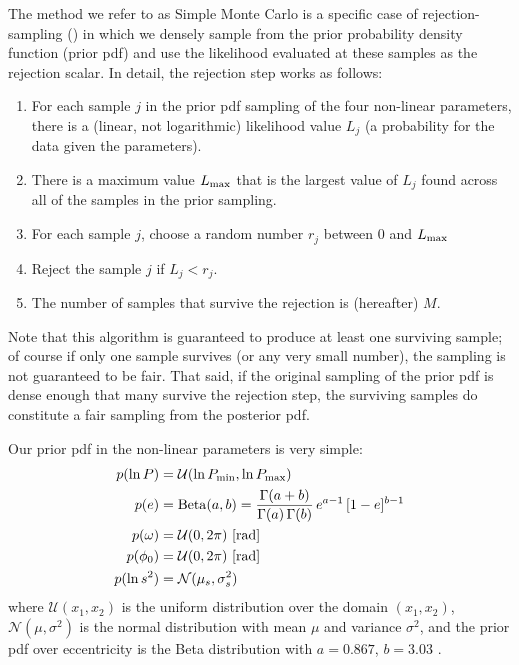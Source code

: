 \documentclass[manuscript, letterpaper]{aastex6}
\begin{document}
The method we refer to as Simple Monte Carlo is a specific case of
rejection-sampling (\citealt{TODO}) in which we densely sample from the prior
probability density function (prior pdf) and use the likelihood evaluated at
these samples as the rejection scalar.
In detail, the rejection step works as follows:
\begin{enumerate}\itemsep0ex
\item For each sample $j$ in the prior pdf sampling of the four non-linear
  parameters, there is a (linear, not logarithmic) likelihood value $L_j$ (a
  probability for the data given the parameters).
\item There is a maximum value $L_{\rm max}$ that is the largest value of
  $L_j$ found across all of the samples in the prior sampling.
\item For each sample $j$, choose a random number $r_j$ between 0 and
  $L_{\rm max}$
\item Reject the sample $j$ if $L_j < r_j$.
\item The number of samples that survive the rejection is (hereafter) $M$.
\end{enumerate}
Note that this algorithm is guaranteed to produce at least one
surviving sample; of course if only one sample survives (or any very
small number), the sampling is not guaranteed to be fair.
That said, if the original sampling of the prior pdf is dense enough
that many survive the rejection step, the surviving samples do
constitute a fair sampling from the posterior pdf.

Our prior pdf in the non-linear parameters is very simple:
\begin{align}
    p(\ln P) &= \mathcal{U}(\ln P_{\rm min}, \ln P_{\rm max})\\
    p(e) &= {\rm Beta}(a, b) = \frac{\Gamma(a+b)}{\Gamma(a) \, \Gamma(b)} \, e^{a-1} \, [1 - e]^{b-1}\\
    p(\omega) &= \mathcal{U}(0, 2\pi) ~ [{\rm rad}]\\
    p(\phi_0) &= \mathcal{U}(0, 2\pi) ~ [{\rm rad}]\\
    p(\ln s^2) &= \mathcal{N}(\mu_s, \sigma^2_s)
\end{align}
where $\mathcal{U}(x_1, x_2)$ is the uniform distribution over the domain $(x_1,
x_2)$, $\mathcal{N}(\mu, \sigma^2)$ is the normal distribution with mean $\mu$
and variance $\sigma^2$, and the prior pdf over eccentricity is the Beta
distribution with $a=0.867$, $b=3.03$ \citep{Kipping:2013}.
\end{document}
